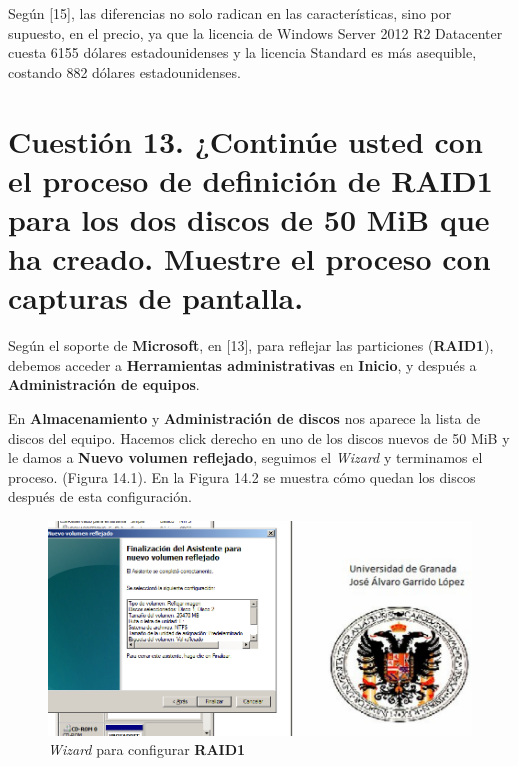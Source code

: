 Según [15], las diferencias no solo radican en las características, sino por supuesto, en el precio, ya que la licencia de Windows Server 2012 R2 Datacenter cuesta 6155 dólares estadounidenses y la licencia Standard es más asequible, costando 882 dólares estadounidenses.



\section{Cuestión 13. ¿Continúe usted con el proceso de definición de RAID1 para los dos discos de 50 MiB que ha creado. Muestre el proceso con capturas de pantalla.}

Según el soporte de \textbf{Microsoft}, en [13], para reflejar las particiones (\textbf{RAID1}), debemos acceder a \textbf{Herramientas administrativas} en \textbf{Inicio}, y después a \textbf{Administración de equipos}.

En \textbf{Almacenamiento} y \textbf{Administración de discos} nos aparece la lista de discos del equipo. Hacemos click derecho en uno de los discos nuevos de 50 MiB y le damos a \textbf{Nuevo volumen reflejado}, seguimos el \textit{Wizard} y terminamos el proceso. (Figura 14.1).
En la Figura 14.2 se muestra cómo quedan los discos después de esta configuración.

\begin{figure}[H] %
\centering
\includegraphics[scale=0.65]{cuestion13-RAID1.PNG}  %
\caption{\textit{Wizard} para configurar \textbf{RAID1}} \label{fig:figura1}
\end{figure}

